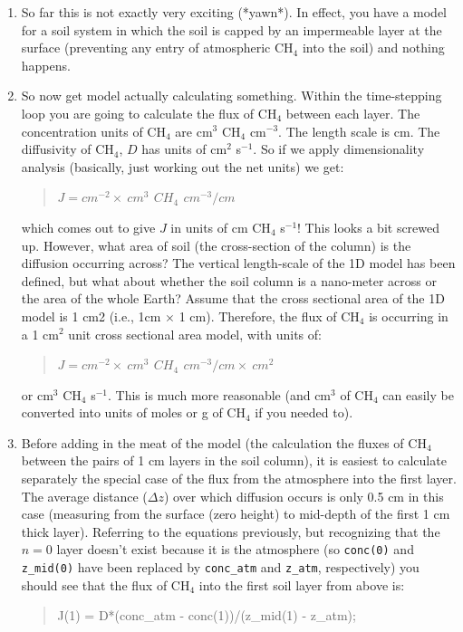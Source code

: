 \documentclass{tufte-book} %
\newenvironment{docspec}{\begin{quotation}\ttfamily\parskip0pt\parindent0pt\ignorespaces}{\end{quotation}}
\begin{document}
\begin{enumerate}
\item
So far this is not exactly very exciting (*yawn*). In effect, you have a model for a soil system in which the soil is capped by an impermeable layer at the surface (preventing any entry of atmospheric CH\(_{4}\) into the soil) and nothing happens.

\item
So now get model actually calculating something. Within the time-stepping loop you are going to calculate the flux of CH\(_{4}\) between each layer. The concentration units of CH\(_{4}\) are cm\(^{3}\) CH\(_{4}\) cm\(^{-3}\). The length scale is cm. The diffusivity of CH\(_{4}\), \(D\) has units of cm\(^{2}\) s\(^{-1}\). So if we apply dimensionality analysis (basically, just working out the net units) we get:
\begin{docspec}
\(J = cm^{-2} \times \ cm^{3}\,\ CH_{4}\,\ cm^{-3} / cm\)
\end{docspec}
which comes out to give \(J\) in units of cm CH\(_{4}\) s\(^{-1}\)! This looks a bit screwed up. However, what area of soil (the cross-section of the column) is the diffusion occurring across? The vertical length-scale of the 1D model has been defined, but what about whether the soil column is a nano-meter across or the area of the whole Earth? Assume that the cross sectional area of the 1D model is 1 cm2 (i.e., 1cm \(\times\) 1 cm). Therefore, the flux of CH\(_{4}\) is occurring in a 1 cm\(^{2}\) unit cross sectional area model, with units of:
\begin{docspec}
\(J = cm^{-2} \times \ cm^{3}\,\ CH_{4}\,\ cm^{-3} / cm \times\ cm^{2}\)
\end{docspec}
or cm\(^{3}\) CH\(_{4}\) s\(^{-1}\). This is much more reasonable (and cm\(^{3}\) of CH\(_{4}\) can easily be converted into units of moles or g of CH\(_{4}\) if you needed to).

\item
Before adding in the meat of the model (the calculation the fluxes of CH\(_{4}\) between the pairs of 1 cm layers in the soil column), it is easiest to calculate separately the special case of the flux from the atmosphere into the first layer. The average distance (\(\Delta z\)) over which diffusion occurs is only 0.5 cm in this case (measuring from the surface (zero height) to mid-depth of the first 1 cm thick layer). Referring to the equations previously, but recognizing that the \(n = 0\) layer doesn't exist because it is the atmosphere (so \texttt{conc(0)} and \texttt{z\_mid(0)} have been replaced by \texttt{conc\_atm} and \texttt{z\_atm}, respectively)  you should see that the flux of CH\(_{4}\) into the first soil layer from above is:
\begin{docspec}
J(1) = D*(conc\_atm - conc(1))/(z\_mid(1) - z\_atm);
\end{docspec}


\end{enumerate}
\end{document}

